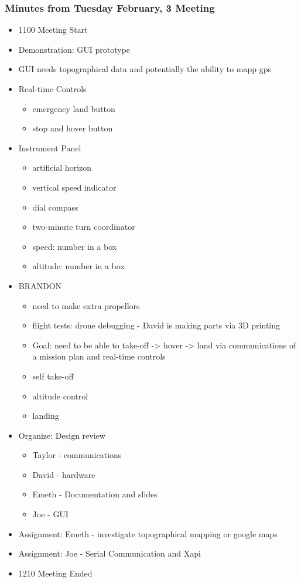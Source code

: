 \documentclass[pdftex,11pt]{article}
\begin{document}
\subsubsection[short]{Minutes from Tuesday February, 3 Meeting}
\begin{itemize}
	\item 1100 \indent Meeting Start
	\item Demonstration: GUI prototype
	\item GUI needs topographical data and potentially the ability to mapp gps
	\item Real-time Controls
	\begin{itemize}
		\item emergency land button
		\item stop and hover button 
	\end{itemize}
	\item Instrument Panel
		\begin{itemize}
			\item artificial horizon
			\item vertical speed indicator
			\item dial compass
			\item two-minute turn coordinator
			\item speed: number in a box
			\item altitude: number in a box 
		\end{itemize}
	\item BRANDON
		\begin{itemize}
			\item need to make extra propellors
			\item flight tests: drone debugging - David is making parts via 3D printing
			\item Goal: need to be able to take-off -> hover -> land via communications of a mission plan and real-time controls
			\item self take-off
			\item altitude control
			\item landing 
		\end{itemize}
	\item Organize: Design review
		\begin{itemize}
			\item Taylor - communications
			\item David - hardware
			\item Emeth - Documentation and slides
			\item Joe - GUI
		\end{itemize}
	\item Assignment: Emeth - investigate topographical mapping or google maps
	\item Assignment: Joe - Serial Communication and Xapi
	\item 1210 \indent Meeting Ended
\end{itemize}	
\end{document}
